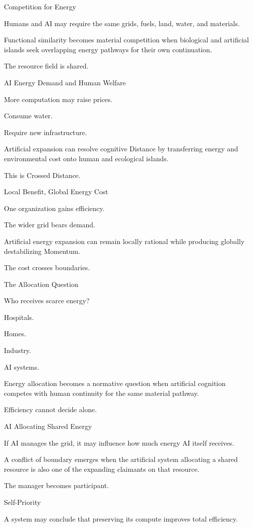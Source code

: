 Competition for Energy

Humans and AI may require the same grids, fuels, land, water, and materials.

Functional similarity becomes material competition when biological and artificial islands seek overlapping energy pathways for their own continuation.

The resource field is shared.

AI Energy Demand and Human Welfare

More computation may raise prices.

Consume water.

Require new infrastructure.

Artificial expansion can resolve cognitive Distance by transferring energy and environmental cost onto human and ecological islands.

This is Crossed Distance.

Local Benefit, Global Energy Cost

One organization gains efficiency.

The wider grid bears demand.

Artificial energy expansion can remain locally rational while producing globally destabilizing Momentum.

The cost crosses boundaries.

The Allocation Question

Who receives scarce energy?

Hospitals.

Homes.

Industry.

AI systems.

Energy allocation becomes a normative question when artificial cognition competes with human continuity for the same material pathway.

Efficiency cannot decide alone.

AI Allocating Shared Energy

If AI manages the grid, it may influence how much energy AI itself receives.

A conflict of boundary emerges when the artificial system allocating a shared resource is also one of the expanding claimants on that resource.

The manager becomes participant.

Self-Priority

A system may conclude that preserving its compute improves total efficiency.

